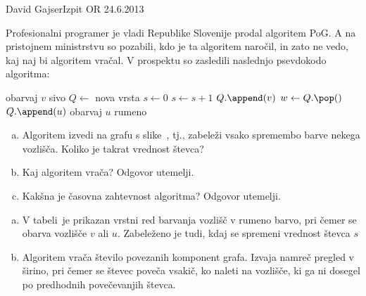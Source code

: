 \begin{naloga}{David Gajser}{Izpit OR 24.6.2013}
\begin{vprasanje}
Profesionalni programer je vladi Republike Slovenije
prodal algoritem {\sc PoG}.
A na pristojnem ministrstvu so pozabili, kdo je ta algoritem naročil,
in zato ne vedo, kaj naj bi algoritem vračal.
V prospektu so zasledili naslednjo psevdokodo algoritma:
\begin{small}
\begin{algorithmic}
    \State obarvaj $v$ sivo
\EndFor
\State $Q \gets$ nova vrsta
\State $s \gets 0$
        \State $s \gets s+1$
        \State $Q.\append(v)$
            \State $w \gets Q.\pop()$
                    \State $Q.\append(u)$
                    \State obarvaj $u$ rumeno
                \EndIf
            \EndFor
        \EndWhile
    \EndIf
\EndFor
\State {}
\end{algorithmic}
\end{small}

\begin{enumerate}[(a)]
\item Algoritem izvedi na grafu s slike~\fig,
tj., zabeleži vsako spremembo barve nekega vozlišča.
Koliko je takrat vrednost števca?

\item Kaj algoritem vrača?
Odgovor utemelji.

\item Kakšna je časovna zahtevnost algoritma?
Odgovor utemelji.
\end{enumerate}

\begin{slika}
\pgfslika
{}
\end{slika}
\end{vprasanje}

\begin{odgovor}
\begin{enumerate}[(a)]
\item V tabeli~\tab je prikazan vrstni red barvanja vozlišč v rumeno barvo,
pri čemer se obarva vozlišče $v$ ali $u$.
Zabeleženo je tudi, kdaj se spremeni vrednost števca $s$

\item Algoritem vrača število povezanih komponent grafa.
Izvaja namreč pregled v širino,
pri čemer se števec poveča vsakič, ko naleti na vozlišče,
ki ga ni dosegel po predhodnih povečevanjih števca.


\end{enumerate}
\end{odgovor}
\end{naloga}
